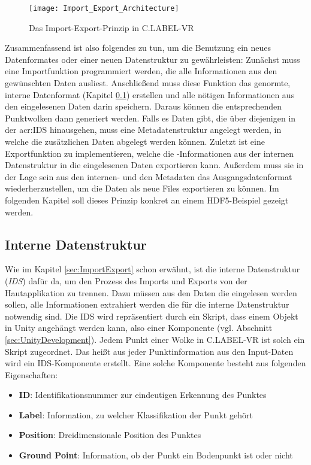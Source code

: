 \begin{figure}%
	\centering
    \texttt{[image: Import\_Export\_Architecture]}
    \caption{Das Import-Export-Prinzip in C.LABEL-VR}
    \label{fig:ImportExport}
\end{figure}

Zusammenfassend ist also folgendes zu tun, um die Benutzung ein neues Datenformates oder einer neuen Datenstruktur zu gewährleisten: Zunächst muss eine Importfunktion programmiert werden, die alle Informationen aus den gewünschten Daten ausliest. Anschließend muss diese Funktion das genormte, interne Datenformat (Kapitel \ref{sec:IDS}) erstellen und alle nötigen Informationen aus den eingelesenen Daten darin speichern. Daraus können die entsprechenden Punktwolken dann generiert werden. Falls es Daten gibt, die über diejenigen in der \acrshort{acr:IDS} hinausgehen, muss eine Metadatenstruktur angelegt werden, in welche die zusätzlichen Daten abgelegt werden können. Zuletzt ist eine Exportfunktion zu implementieren, welche die -Informationen aus der internen Datenstruktur in die eingelesenen Daten exportieren kann. Außerdem muss sie in der Lage sein aus den internen- und den Metadaten das Ausgangsdatenformat wiederherzustellen, um die Daten als neue Files exportieren zu können. Im folgenden Kapitel soll dieses Prinzip konkret an einem HDF5-Beispiel gezeigt werden.

\subsection{Interne Datenstruktur}
\label{sec:IDS}
Wie im Kapitel \ref{sec:ImportExport} schon erwähnt, ist die interne Datenstruktur (\textit{IDS}) dafür da, um den Prozess des Imports und Exports von der Hautapplikation zu trennen. Dazu müssen aus den Daten die eingelesen werden sollen, alle Informationen extrahiert werden die für die interne Datenstruktur notwendig sind. Die IDS wird repräsentiert durch ein Skript, dass einem Objekt in Unity angehängt werden kann, also einer Komponente (vgl. Abschnitt \ref{sec:UnityDevelopment}). Jedem Punkt einer Wolke in C.LABEL-VR ist solch ein Skript zugeordnet. Das heißt aus jeder Punktinformation aus den Input-Daten wird ein IDS-Komponente erstellt. Eine solche Komponente besteht aus folgenden Eigenschaften:

\begin{itemize}
\item \textbf{ID}: Identifikationsnummer zur eindeutigen Erkennung des Punktes
\item \textbf{Label}: Information, zu welcher Klassifikation der Punkt gehört
\item \textbf{Position}: Dreidimensionale Position des Punktes
\item \textbf{Ground Point}: Information, ob der Punkt ein Bodenpunkt ist oder nicht
\end{itemize}

